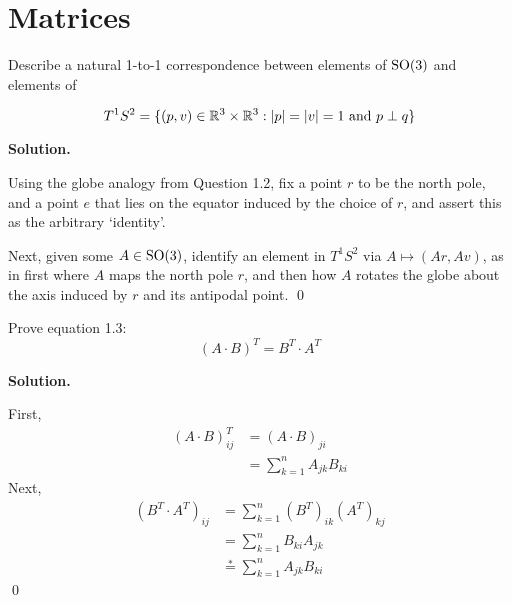 \documentclass[12pt]{book}
\theoremstyle{definition}
\newenvironment{solution}
{%
  \par\noindent\textbf{Solution.}\quad
}
{%
  \qed\par
}
\begin{document}
\mainmatter

\chapter{Matrices}

\begin{taggedexercise}[\textcolor{green}{Complete}]
Describe a natural 1-to-1 correspondence between elements of $\mathrm{SO}(3)$ and elements of

\[
T^1S^2 = \{ (p, v) \in \mathbb{R}^3 \times \mathbb{R}^3 : |p| = |v| = 1 \text{ and } p \perp q\}
\]

\end{taggedexercise}

\begin{solution}
Using the globe analogy from Question 1.2, fix a point $r$ to be the north pole, 
and a point $e$ that lies on the equator induced by the choice of $r$, and assert this as the arbitrary `identity'.

Next, given some $A \in \mathrm{SO}(3)$, identify an element in $T^1S^2$ via $A \mapsto (Ar, Av)$, 
as in first where $A$ maps the north pole $r$, and then how $A$ rotates the globe about the axis induced by $r$ and its antipodal point.
\end{solution}

\begin{taggedexercise}[\textcolor{green}{Complete}]
  Prove equation 1.3:
  \[
  (A \cdot B)^T = B^T \cdot A^T
  \]
\end{taggedexercise}

\begin{solution}
  First, 
  \[
    \begin{aligned}
      (A \cdot B)^T_{ij} &= (A \cdot B)_{ji} \\
                         &= \sum_{k=1}^n A_{jk}B_{ki}
   \end{aligned}
  \]
   Next, 
   \[
    \begin{aligned}
      (B^T \cdot A^T)_{ij} &= \sum_{k=1}^n(B^T)_{ik}(A^T)_{kj} \\
                         &= \sum_{k=1}^n B_{ki}A_{jk} \\
                         &\stackrel{*}{=} \sum_{k=1}^n A_{jk}B_{ki}
   \end{aligned}
  \]
\end{solution}
\end{document}
